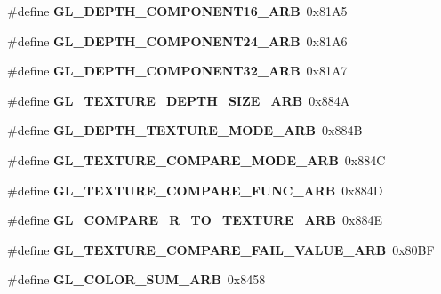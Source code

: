 \begin{DoxyCompactItemize}
\item 
\#define {\bfseries G\+L\+\_\+\+D\+E\+P\+T\+H\+\_\+\+C\+O\+M\+P\+O\+N\+E\+N\+T16\+\_\+\+A\+R\+B}~0x81\+A5\label{_s_d_l__opengl_8h_a6d78bd241e215a14f1aee776d501bc3c}

\item 
\#define {\bfseries G\+L\+\_\+\+D\+E\+P\+T\+H\+\_\+\+C\+O\+M\+P\+O\+N\+E\+N\+T24\+\_\+\+A\+R\+B}~0x81\+A6\label{_s_d_l__opengl_8h_a720637b12a359130c68d2b5598c78e68}

\item 
\#define {\bfseries G\+L\+\_\+\+D\+E\+P\+T\+H\+\_\+\+C\+O\+M\+P\+O\+N\+E\+N\+T32\+\_\+\+A\+R\+B}~0x81\+A7\label{_s_d_l__opengl_8h_a80f92da69c84a61253b06ebec99d2900}

\item 
\#define {\bfseries G\+L\+\_\+\+T\+E\+X\+T\+U\+R\+E\+\_\+\+D\+E\+P\+T\+H\+\_\+\+S\+I\+Z\+E\+\_\+\+A\+R\+B}~0x884\+A\label{_s_d_l__opengl_8h_a7ab9cb0cb0d6d0e00b6bebc2007cbc7f}

\item 
\#define {\bfseries G\+L\+\_\+\+D\+E\+P\+T\+H\+\_\+\+T\+E\+X\+T\+U\+R\+E\+\_\+\+M\+O\+D\+E\+\_\+\+A\+R\+B}~0x884\+B\label{_s_d_l__opengl_8h_a2b2854f413bbf9d2e9cf2ab18a0e754d}

\item 
\#define {\bfseries G\+L\+\_\+\+T\+E\+X\+T\+U\+R\+E\+\_\+\+C\+O\+M\+P\+A\+R\+E\+\_\+\+M\+O\+D\+E\+\_\+\+A\+R\+B}~0x884\+C\label{_s_d_l__opengl_8h_ad09367a91fb405c54c1d121ed3b8beae}

\item 
\#define {\bfseries G\+L\+\_\+\+T\+E\+X\+T\+U\+R\+E\+\_\+\+C\+O\+M\+P\+A\+R\+E\+\_\+\+F\+U\+N\+C\+\_\+\+A\+R\+B}~0x884\+D\label{_s_d_l__opengl_8h_a61b39b4b4bdda3a8d403050f45dbe59b}

\item 
\#define {\bfseries G\+L\+\_\+\+C\+O\+M\+P\+A\+R\+E\+\_\+\+R\+\_\+\+T\+O\+\_\+\+T\+E\+X\+T\+U\+R\+E\+\_\+\+A\+R\+B}~0x884\+E\label{_s_d_l__opengl_8h_af4d69081972263db4cfdfe5ad836e476}

\item 
\#define {\bfseries G\+L\+\_\+\+T\+E\+X\+T\+U\+R\+E\+\_\+\+C\+O\+M\+P\+A\+R\+E\+\_\+\+F\+A\+I\+L\+\_\+\+V\+A\+L\+U\+E\+\_\+\+A\+R\+B}~0x80\+B\+F\label{_s_d_l__opengl_8h_a55157956c685886952c7547ae7db602e}

\item 
\#define {\bfseries G\+L\+\_\+\+C\+O\+L\+O\+R\+\_\+\+S\+U\+M\+\_\+\+A\+R\+B}~0x8458\label{_s_d_l__opengl_8h_aec03f19ecb079e28e278fe2f2bc4e9ca}


\end{DoxyCompactItemize}
